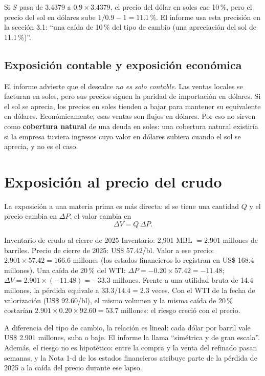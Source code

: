 \begin{cuidado}
Si $S$ pasa de 3.4379 a $0.9\times3.4379$, el precio del dólar en soles cae 10\,\%, pero el precio del sol en dólares sube $1/0.9-1=11.1\,\%$. El informe usa esta precisión en la sección 3.1: \enquote{una caída de 10\,\% del tipo de cambio (una apreciación del sol de 11.1\,\%)}.
\end{cuidado}

\subsection{Exposición contable y exposición económica}

El informe advierte que el descalce \emph{no es solo contable}. Las ventas locales se facturan en soles, pero sus precios siguen la paridad de importación en dólares. Si el sol se aprecia, los precios en soles tienden a bajar para mantener su equivalente en dólares. Económicamente, esas ventas son flujos en dólares. Por eso no sirven como \textbf{cobertura natural} de una deuda en soles: una cobertura natural existiría si la empresa tuviera ingresos cuyo valor en dólares subiera cuando el sol se aprecia, y no es el caso.

\section{Exposición al precio del crudo}

La exposición a una materia prima es más directa: si se tiene una cantidad $Q$ y el precio cambia en $\Delta P$, el valor cambia en
\[ \Delta V=Q\,\Delta P. \]

\begin{ejemplo}{Inventario de crudo al cierre de 2025}
Inventario: 2,901 MBL $=2.901$ millones de barriles. Precio de cierre de 2025: US\$ 57.42/bl. Valor a ese precio: $2.901\times57.42=166.6$ millones (los estados financieros lo registran en US\$ 168.4 millones). Una caída de 20\,\% del WTI: $\Delta P=-0.20\times57.42=-11.48$; $\Delta V=2.901\times(-11.48)=-33.3$ millones. Frente a una utilidad bruta de 14.4 millones, la pérdida equivale a $33.3/14.4=2.3$ veces. Con el WTI de la fecha de valorización (US\$ 92.60/bl), el mismo volumen y la misma caída de 20\,\% costarían $2.901\times0.20\times92.60=53.7$ millones: el riesgo creció con el precio.
\end{ejemplo}

A diferencia del tipo de cambio, la relación es lineal: cada dólar por barril vale US\$ 2.901 millones, suba o baje. El informe la llama \enquote{simétrica y de gran escala}. Además, el riesgo no es hipotético: entre la compra y la venta del refinado pasan semanas, y la Nota 1-d de los estados financieros atribuye parte de la pérdida de 2025 a la caída del precio durante ese lapso.

